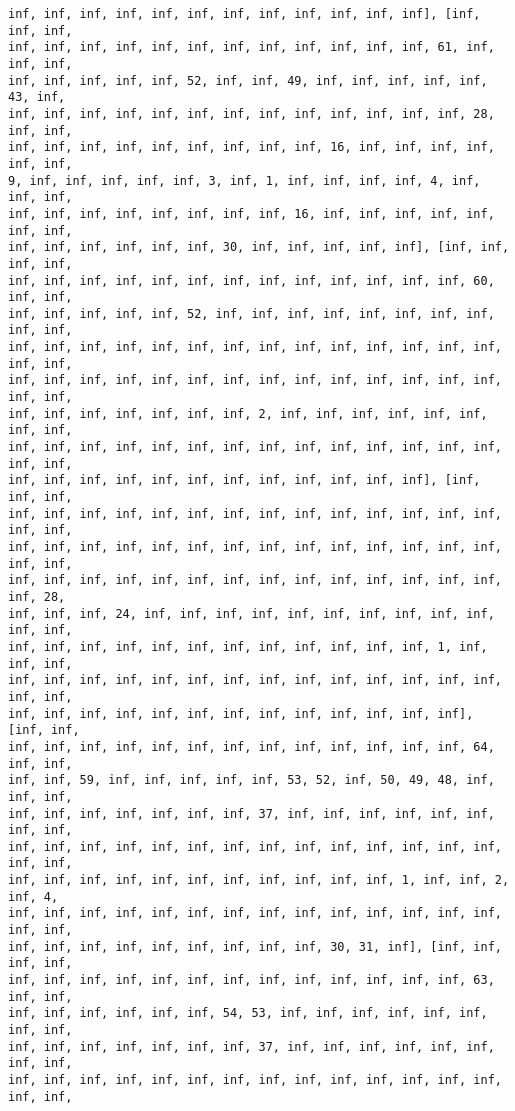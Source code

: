 \documentclass[11pt]{article}
\begin{document}
\begin{Verbatim}[commandchars=\\\{\}]
inf, inf, inf, inf, inf, inf, inf, inf, inf, inf, inf, inf], [inf, inf, inf,
inf, inf, inf, inf, inf, inf, inf, inf, inf, inf, inf, inf, 61, inf, inf, inf,
inf, inf, inf, inf, inf, 52, inf, inf, 49, inf, inf, inf, inf, inf, 43, inf,
inf, inf, inf, inf, inf, inf, inf, inf, inf, inf, inf, inf, inf, 28, inf, inf,
inf, inf, inf, inf, inf, inf, inf, inf, inf, 16, inf, inf, inf, inf, inf, inf,
9, inf, inf, inf, inf, inf, 3, inf, 1, inf, inf, inf, inf, 4, inf, inf, inf,
inf, inf, inf, inf, inf, inf, inf, inf, 16, inf, inf, inf, inf, inf, inf, inf,
inf, inf, inf, inf, inf, inf, 30, inf, inf, inf, inf, inf], [inf, inf, inf, inf,
inf, inf, inf, inf, inf, inf, inf, inf, inf, inf, inf, inf, inf, 60, inf, inf,
inf, inf, inf, inf, inf, 52, inf, inf, inf, inf, inf, inf, inf, inf, inf, inf,
inf, inf, inf, inf, inf, inf, inf, inf, inf, inf, inf, inf, inf, inf, inf, inf,
inf, inf, inf, inf, inf, inf, inf, inf, inf, inf, inf, inf, inf, inf, inf, inf,
inf, inf, inf, inf, inf, inf, inf, 2, inf, inf, inf, inf, inf, inf, inf, inf,
inf, inf, inf, inf, inf, inf, inf, inf, inf, inf, inf, inf, inf, inf, inf, inf,
inf, inf, inf, inf, inf, inf, inf, inf, inf, inf, inf, inf], [inf, inf, inf,
inf, inf, inf, inf, inf, inf, inf, inf, inf, inf, inf, inf, inf, inf, inf, inf,
inf, inf, inf, inf, inf, inf, inf, inf, inf, inf, inf, inf, inf, inf, inf, inf,
inf, inf, inf, inf, inf, inf, inf, inf, inf, inf, inf, inf, inf, inf, inf, 28,
inf, inf, inf, 24, inf, inf, inf, inf, inf, inf, inf, inf, inf, inf, inf, inf,
inf, inf, inf, inf, inf, inf, inf, inf, inf, inf, inf, inf, 1, inf, inf, inf,
inf, inf, inf, inf, inf, inf, inf, inf, inf, inf, inf, inf, inf, inf, inf, inf,
inf, inf, inf, inf, inf, inf, inf, inf, inf, inf, inf, inf, inf], [inf, inf,
inf, inf, inf, inf, inf, inf, inf, inf, inf, inf, inf, inf, inf, 64, inf, inf,
inf, inf, 59, inf, inf, inf, inf, inf, 53, 52, inf, 50, 49, 48, inf, inf, inf,
inf, inf, inf, inf, inf, inf, inf, 37, inf, inf, inf, inf, inf, inf, inf, inf,
inf, inf, inf, inf, inf, inf, inf, inf, inf, inf, inf, inf, inf, inf, inf, inf,
inf, inf, inf, inf, inf, inf, inf, inf, inf, inf, inf, 1, inf, inf, 2, inf, 4,
inf, inf, inf, inf, inf, inf, inf, inf, inf, inf, inf, inf, inf, inf, inf, inf,
inf, inf, inf, inf, inf, inf, inf, inf, inf, 30, 31, inf], [inf, inf, inf, inf,
inf, inf, inf, inf, inf, inf, inf, inf, inf, inf, inf, inf, inf, 63, inf, inf,
inf, inf, inf, inf, inf, inf, 54, 53, inf, inf, inf, inf, inf, inf, inf, inf,
inf, inf, inf, inf, inf, inf, inf, 37, inf, inf, inf, inf, inf, inf, inf, inf,
inf, inf, inf, inf, inf, inf, inf, inf, inf, inf, inf, inf, inf, inf, inf, inf,

\end{Verbatim}
\end{document}
